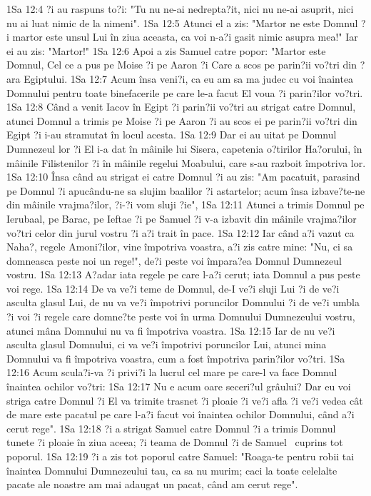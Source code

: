 1Sa 12:4  ?i au raspuns to?i: "Tu nu ne-ai nedrepta?it, nici nu ne-ai asuprit, nici nu ai luat nimic de la nimeni".
1Sa 12:5  Atunci el a zis: "Martor ne este Domnul ?i martor este unsul Lui în ziua aceasta, ca voi n-a?i gasit nimic asupra mea!" Iar ei au zis: "Martor!"
1Sa 12:6  Apoi a zis Samuel catre popor: "Martor este Domnul, Cel ce a pus pe Moise ?i pe Aaron ?i Care a scos pe parin?ii vo?tri din ?ara Egiptului.
1Sa 12:7  Acum însa veni?i, ca eu am sa ma judec cu voi înaintea Domnului pentru toate binefacerile pe care le-a facut El voua ?i parin?ilor vo?tri.
1Sa 12:8  Când a venit Iacov în Egipt ?i parin?ii vo?tri au strigat catre Domnul, atunci Domnul a trimis pe Moise ?i pe Aaron ?i au scos ei pe parin?ii vo?tri din Egipt ?i i-au stramutat în locul acesta.
1Sa 12:9  Dar ei au uitat pe Domnul Dumnezeul lor ?i El i-a dat în mâinile lui Sisera, capetenia o?tirilor Ha?orului, în mâinile Filistenilor ?i în mâinile regelui Moabului, care s-au razboit împotriva lor.
1Sa 12:10  Însa când au strigat ei catre Domnul ?i au zis: "Am pacatuit, parasind pe Domnul ?i apucându-ne sa slujim baalilor ?i astartelor; acum însa izbave?te-ne din mâinile vrajma?ilor, ?i-?i vom sluji ?ie",
1Sa 12:11  Atunci a trimis Domnul pe Ierubaal, pe Barac, pe Ieftae ?i pe Samuel ?i v-a izbavit din mâinile vrajma?ilor vo?tri celor din jurul vostru ?i a?i trait în pace.
1Sa 12:12  Iar când a?i vazut ca Naha?, regele Amoni?ilor, vine împotriva voastra, a?i zis catre mine: "Nu, ci sa domneasca peste noi un rege!", de?i peste voi împara?ea Domnul Dumnezeul vostru.
1Sa 12:13  A?adar iata regele pe care l-a?i cerut; iata Domnul a pus peste voi rege.
1Sa 12:14  De va ve?i teme de Domnul, de-I ve?i sluji Lui ?i de ve?i asculta glasul Lui, de nu va ve?i împotrivi poruncilor Domnului ?i de ve?i umbla ?i voi ?i regele care domne?te peste voi în urma Domnului Dumnezeului vostru, atunci mâna Domnului nu va fi împotriva voastra.
1Sa 12:15  Iar de nu ve?i asculta glasul Domnului, ci va ve?i împotrivi poruncilor Lui, atunci mina Domnului va fi împotriva voastra, cum a fost împotriva parin?ilor vo?tri.
1Sa 12:16  Acum scula?i-va ?i privi?i la lucrul cel mare pe care-l va face Domnul înaintea ochilor vo?tri:
1Sa 12:17  Nu e acum oare seceri?ul grâului? Dar eu voi striga catre Domnul ?i El va trimite trasnet ?i ploaie ?i ve?i afla ?i ve?i vedea cât de mare este pacatul pe care l-a?i facut voi înaintea ochilor Domnului, când a?i cerut rege".
1Sa 12:18  ?i a strigat Samuel catre Domnul ?i a trimis Domnul tunete ?i ploaie în ziua aceea; ?i teama de Domnul ?i de Samuel  cuprins tot poporul.
1Sa 12:19  ?i a zis tot poporul catre Samuel: "Roaga-te pentru robii tai înaintea Domnului Dumnezeului tau, ca sa nu murim; caci la toate celelalte pacate ale noastre am mai adaugat un pacat, când am cerut rege".
